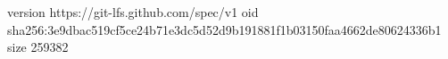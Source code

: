 version https://git-lfs.github.com/spec/v1
oid sha256:3e9dbac519cf5ce24b71e3dc5d52d9b191881f1b03150faa4662de80624336b1
size 259382
